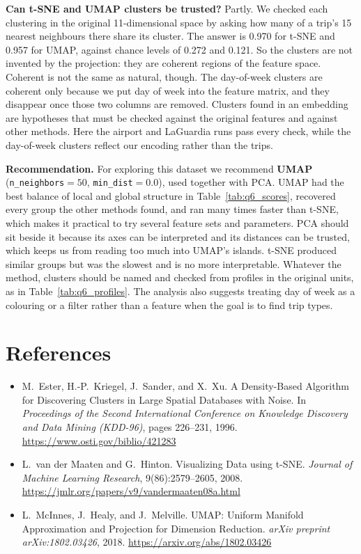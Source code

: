 \documentclass{article}
\begin{document}
\textbf{Can t-SNE and UMAP clusters be trusted?} Partly. We checked each clustering in the original 11-dimensional space by asking how many of a trip's 15 nearest neighbours there share its cluster. The answer is 0.970 for t-SNE and 0.957 for UMAP, against chance levels of 0.272 and 0.121. So the clusters are not invented by the projection: they are coherent regions of the feature space. Coherent is not the same as natural, though. The day-of-week clusters are coherent only because we put day of week into the feature matrix, and they disappear once those two columns are removed. Clusters found in an embedding are hypotheses that must be checked against the original features and against other methods. Here the airport and LaGuardia runs pass every check, while the day-of-week clusters reflect our encoding rather than the trips.

\textbf{Recommendation.} For exploring this dataset we recommend \textbf{UMAP} (\texttt{n\_neighbors}$=50$, \texttt{min\_dist}$=0.0$), used together with PCA. UMAP had the best balance of local and global structure in Table~\ref{tab:q6_scores}, recovered every group the other methods found, and ran many times faster than t-SNE, which makes it practical to try several feature sets and parameters. PCA should sit beside it because its axes can be interpreted and its distances can be trusted, which keeps us from reading too much into UMAP's islands. t-SNE produced similar groups but was the slowest and is no more interpretable. Whatever the method, clusters should be named and checked from profiles in the original units, as in Table~\ref{tab:q6_profiles}. The analysis also suggests treating day of week as a colouring or a filter rather than a feature when the goal is to find trip types.

\section*{References}
{\small
\begin{itemize}
  \setlength{\itemsep}{4pt}

  \item[{[1]}]\label{ref:1} M.~Ester, H.-P.~Kriegel, J.~Sander, and X.~Xu.
    A Density-Based Algorithm for Discovering Clusters in Large Spatial Databases with Noise.
    In \textit{Proceedings of the Second International Conference on Knowledge Discovery and Data Mining (KDD-96)},
    pages 226--231, 1996.
    \url{https://www.osti.gov/biblio/421283}

  \item[{[2]}]\label{ref:2} L.~van der Maaten and G.~Hinton.
    Visualizing Data using t-SNE.
    \textit{Journal of Machine Learning Research}, 9(86):2579--2605, 2008.
    \url{https://jmlr.org/papers/v9/vandermaaten08a.html}

  \item[{[3]}]\label{ref:3} L.~McInnes, J.~Healy, and J.~Melville.
    UMAP: Uniform Manifold Approximation and Projection for Dimension Reduction.
    \textit{arXiv preprint arXiv:1802.03426}, 2018.
    \url{https://arxiv.org/abs/1802.03426}
\end{itemize}
}
\end{document}
